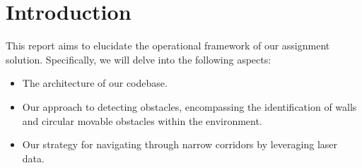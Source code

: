 \section{Introduction}
This report aims to elucidate the operational framework of our assignment solution. Specifically, we will delve into the following aspects:
\begin{itemize}
	\item The architecture of our codebase.
	\item Our approach to detecting obstacles, encompassing the identification of walls and circular movable obstacles within the environment.
	\item Our strategy for navigating through narrow corridors by leveraging laser data.
\end{itemize}